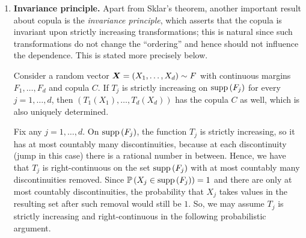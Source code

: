 \begin{enumerate}
\item \textbf{Invariance principle.} Apart from Sklar's theorem, another
important result about copula is the \emph{invariance principle}, which asserts
that the copula is invariant upon strictly increasing transformations; this is
natural since such transformations do not change the ``ordering'' and hence
should not influence the dependence. This is stated more precisely below.

\begin{theorem}
\label{thm:invariance}
Consider a random vector \(\bm{X}=(X_1,\dotsc,X_d)\sim F\) with continuous
margins \(F_1,\dotsc,F_d\) and copula \(C\). If \(T_j\) is strictly increasing on
\(\operatorname{supp}\left(F_j\right)\) for every \(j=1,\dotsc,d\), then \((T_1(X_1),\dotsc,T_d(X_d))\)
has the copula \(C\) as well, which is also uniquely determined.
\end{theorem}
\begin{pf}
Fix any \(j=1,\dotsc,d\). On \(\operatorname{supp}\left(F_j\right)\), the function \(T_j\) is strictly
increasing, so it has at most countably many discontinuities, because at each
discontinuity (jump in this case) there is a rational number in between. Hence,
we have that \(T_j\) is right-continuous on the set \(\operatorname{supp}\left(F_j\right)\) with at most
countably many discontinuities removed. Since \(\mathbb{P}\left(X_j\in \operatorname{supp}\left(F_j\right)\right)=1\)
and there are only at most countably discontinuities, the probability that
\(X_j\) takes values in the resulting set after such removal would still be \(1\).
So, we may assume \(T_j\) is strictly increasing and right-continuous in the
following probabilistic argument.


\end{pf}
\end{enumerate}
